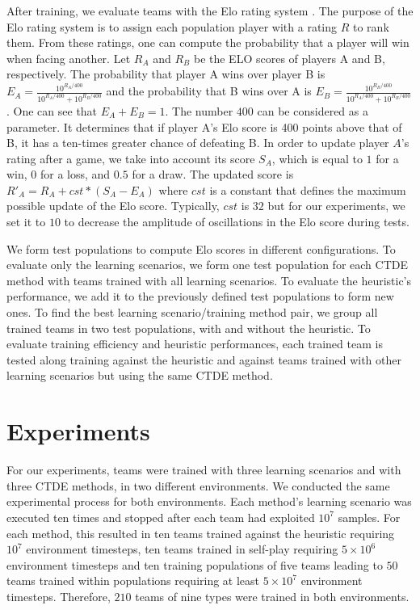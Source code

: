 After training, we evaluate teams with the Elo rating system \citep{elo1978rating}.
The purpose of the Elo rating system is to assign each population player with a rating $R$ to rank them.
From these ratings, one can compute the probability that a player will win when facing another.
Let $R_A$ and $R_B$ be the ELO scores of players A and B, respectively.
The probability that player A wins over player B is $E_A=\frac{10^{R_A/400}}{10^{R_A/400} + 10^{R_B/400}}$ and the probability that B wins over A is $E_B=\frac{10^{R_B/400}}{10^{R_A/400} + 10^{R_B/400}}$.
One can see that $E_A + E_B = 1$.
The number $400$ can be considered as a parameter.
It determines that if player A's Elo score is 400 points above that of B, it has a ten-times greater chance of defeating B.
In order to update player $ A$'s rating after a game, we take into account its score $S_A$, which is equal to $1$ for a win, $0$ for a loss, and $0.5$ for a draw.
The updated score is $R'_A = R_A + cst * (S_A - E_A)$ where $cst$ is a constant that defines the maximum possible update of the Elo score.
Typically, $cst$ is $32$ but for our experiments, we set it to $10$ to decrease the amplitude of oscillations in the Elo score during tests.

We form test populations to compute Elo scores in different configurations.
To evaluate only the learning scenarios, we form one test population for each CTDE method with teams trained with all learning scenarios.
To evaluate the heuristic's performance, we add it to the previously defined test populations to form new ones.
To find the best learning scenario/training method pair, we group all trained teams in two test populations, with and without the heuristic.
To evaluate training efficiency and heuristic performances, each trained team is tested along training against the heuristic and against teams trained with other learning scenarios but using the same CTDE method.

\section{Experiments} \label{sec:ch7_experiments}

For our experiments, teams were trained with three learning scenarios and with three CTDE methods, in two different environments.
We conducted the same experimental process for both environments.
Each method's learning scenario was executed ten times and stopped after each team had exploited $10^7$ samples.
For each method, this resulted in ten teams trained against the heuristic requiring $10^7$ environment timesteps, ten teams trained in self-play requiring $5\times10^6$ environment timesteps and ten training populations of five teams leading to $50$ teams trained within populations requiring at least $5\times10^7$ environment timesteps.
Therefore, $210$ teams of nine types were trained in both environments.

